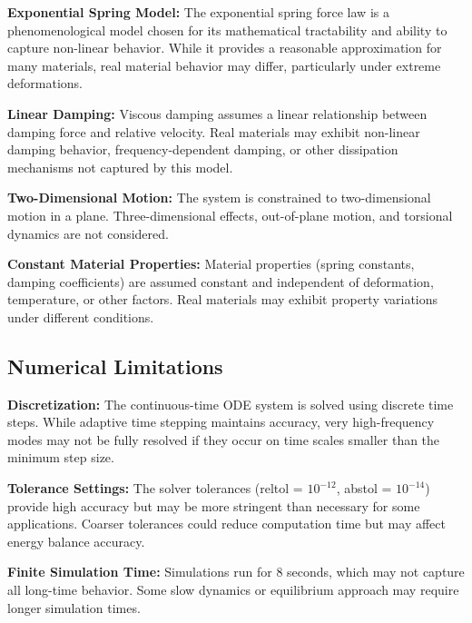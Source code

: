 \documentclass[11pt,a4paper]{article}
\begin{document}
\noindent \textbf{Exponential Spring Model:} The exponential spring force law is a phenomenological model chosen for its mathematical tractability and ability to capture non-linear behavior. While it provides a reasonable approximation for many materials, real material behavior may differ, particularly under extreme deformations. \newline

\noindent \textbf{Linear Damping:} Viscous damping assumes a linear relationship between damping force and relative velocity. Real materials may exhibit non-linear damping behavior, frequency-dependent damping, or other dissipation mechanisms not captured by this model. \newline

\noindent \textbf{Two-Dimensional Motion:} The system is constrained to two-dimensional motion in a plane. Three-dimensional effects, out-of-plane motion, and torsional dynamics are not considered. \newline

\noindent \textbf{Constant Material Properties:} Material properties (spring constants, damping coefficients) are assumed constant and independent of deformation, temperature, or other factors. Real materials may exhibit property variations under different conditions. \newline

\subsection{Numerical Limitations}

\noindent \textbf{Discretization:} The continuous-time ODE system is solved using discrete time steps. While adaptive time stepping maintains accuracy, very high-frequency modes may not be fully resolved if they occur on time scales smaller than the minimum step size. \newline

\noindent \textbf{Tolerance Settings:} The solver tolerances (reltol = $10^{-12}$, abstol = $10^{-14}$) provide high accuracy but may be more stringent than necessary for some applications. Coarser tolerances could reduce computation time but may affect energy balance accuracy. \newline

\noindent \textbf{Finite Simulation Time:} Simulations run for 8 seconds, which may not capture all long-time behavior. Some slow dynamics or equilibrium approach may require longer simulation times. \newline
\end{document}
